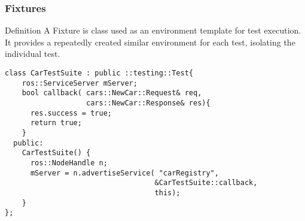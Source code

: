 \documentclass{beamer}
\begin{document}
\begin{frame}[fragile]
  \frametitle{Fixtures}
  \begin{block}{Definition}
    A Fixture is class used as an environment template for test execution. It provides a repeatedly created similar environment for each test, isolating the individual test.
  \end{block}
  \pause
  \begin{lstlisting}[style=code, basicstyle=\ttfamily\scriptsize\color{white}]
class CarTestSuite : public ::testing::Test{
    ros::ServiceServer mServer;
    bool callback( cars::NewCar::Request& req,
                   cars::NewCar::Response& res){
      res.success = true;
      return true;
    }
  public:
    CarTestSuite() {
      ros::NodeHandle n;
      mServer = n.advertiseService( "carRegistry", 
                                   &CarTestSuite::callback, 
                                   this);
    }
};
  \end{lstlisting}
\end{frame}
\end{document}

